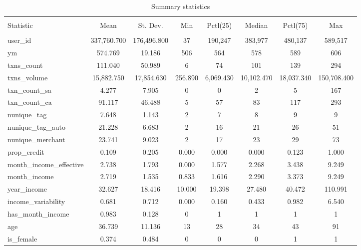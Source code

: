 
\begin{table}[!htbp] \centering 
  \caption{Summary statistics} 
  \label{tab:sumstats} 
\scriptsize 
\begin{tabular}{@{\extracolsep{5pt}}lccccccc} 
\\[-1.8ex]\hline 
\hline \\[-1.8ex] 
Statistic & \multicolumn{1}{c}{Mean} & \multicolumn{1}{c}{St. Dev.} & \multicolumn{1}{c}{Min} & \multicolumn{1}{c}{Pctl(25)} & \multicolumn{1}{c}{Median} & \multicolumn{1}{c}{Pctl(75)} & \multicolumn{1}{c}{Max} \\ 
\hline \\[-1.8ex] 
user\_id & 337,760.700 & 176,496.800 & 37 & 190,247 & 383,977 & 480,137 & 589,517 \\ 
ym & 574.769 & 19.186 & 506 & 564 & 578 & 589 & 606 \\ 
txns\_count & 111.040 & 50.989 & 6 & 74 & 101 & 139 & 294 \\ 
txns\_volume & 15,882.750 & 17,854.630 & 256.890 & 6,069.430 & 10,102.470 & 18,037.340 & 150,708.400 \\ 
txn\_count\_sa & 4.277 & 7.905 & 0 & 0 & 2 & 5 & 167 \\ 
txn\_count\_ca & 91.117 & 46.488 & 5 & 57 & 83 & 117 & 293 \\ 
nunique\_tag & 7.648 & 1.143 & 2 & 7 & 8 & 9 & 9 \\ 
nunique\_tag\_auto & 21.228 & 6.683 & 2 & 16 & 21 & 26 & 51 \\ 
nunique\_merchant & 23.741 & 9.023 & 2 & 17 & 23 & 29 & 73 \\ 
prop\_credit & 0.109 & 0.205 & 0.000 & 0.000 & 0.000 & 0.123 & 1.000 \\ 
month\_income\_effective & 2.738 & 1.793 & 0.000 & 1.577 & 2.268 & 3.438 & 9.249 \\ 
month\_income & 2.719 & 1.535 & 0.833 & 1.616 & 2.290 & 3.373 & 9.249 \\ 
year\_income & 32.627 & 18.416 & 10.000 & 19.398 & 27.480 & 40.472 & 110.991 \\ 
income\_variability & 0.681 & 0.712 & 0.000 & 0.160 & 0.433 & 0.982 & 6.540 \\ 
has\_month\_income & 0.983 & 0.128 & 0 & 1 & 1 & 1 & 1 \\ 
age & 36.739 & 11.136 & 13 & 28 & 34 & 43 & 91 \\ 
is\_female & 0.374 & 0.484 & 0 & 0 & 0 & 1 & 1 \\ 

\end{tabular}
\end{table}
